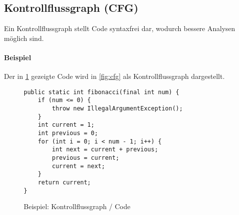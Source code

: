 		\subsection{Kontrollflussgraph (CFG)}
			\label{diagram:cfg}

			Ein Kontrollflussgraph stellt Code syntaxfrei dar, wodurch bessere Analysen möglich sind.

			\paragraph{Beispiel}
				Der in \ref{fig:cfgcode} gezeigte Code wird in \ref{fig:cfg} als Kontrollflussgraph dargestellt.

				\begin{figure}[ht]
					\centering
					\begin{lstlisting}
public static int fibonacci(final int num) {
	if (num <= 0) {
		throw new IllegalArgumentException();
	}
	int current = 1;
	int previous = 0;
	for (int i = 0; i < num - 1; i++) {
		int next = current + previous;
		previous = current;
		current = next;
	}
	return current;
}
					\end{lstlisting}
					\caption{Beispiel: Kontrollflussgraph / Code}
					\label{fig:cfgcode}
				\end{figure}

